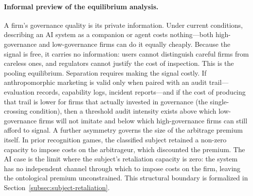 \paragraph{Informal preview of the equilibrium analysis.}
A firm's governance quality is its private information. Under current conditions, describing an AI system as a companion or agent costs nothing---both high-governance and low-governance firms can do it equally cheaply. Because the signal is free, it carries no information: users cannot distinguish careful firms from careless ones, and regulators cannot justify the cost of inspection. This is the pooling equilibrium. Separation requires making the signal costly. If anthropomorphic marketing is valid only when paired with an audit trail---evaluation records, capability logs, incident reports---and if the cost of producing that trail is lower for firms that actually invested in governance (the single-crossing condition), then a threshold audit intensity exists above which low-governance firms will not imitate and below which high-governance firms can still afford to signal. A further asymmetry governs the size of the arbitrage premium itself. In prior recognition games, the classified subject retained a non-zero capacity to impose costs on the arbitrageur, which discounted the premium. The AI case is the limit where the subject's retaliation capacity is zero: the system has no independent channel through which to impose costs on the firm, leaving the ontological premium unconstrained. This structural boundary is formalized in Section~\ref{subsec:subject-retaliation}.
